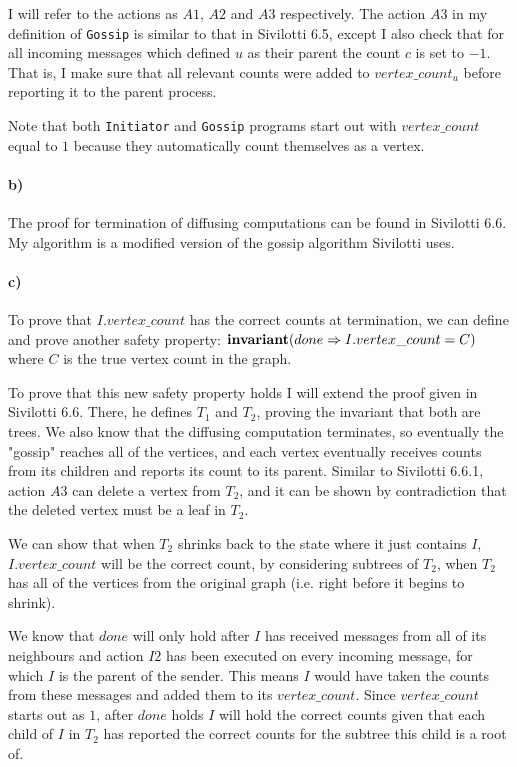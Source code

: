 \documentclass[10pt,letter]{article}
\begin{document}
I will refer to the actions as $A1$, $A2$ and $A3$ respectively. The action $A3$ in my definition of \texttt{Gossip} is similar to that in Sivilotti 6.5, except I also check that for all incoming messages which defined $u$ as their parent the count $c$ is set to $-1$. That is, I make sure that all relevant counts were added to $vertex\_count_u$ before reporting it to the parent process.

Note that both \texttt{Initiator} and \texttt{Gossip} programs start out with $vertex\_count$ equal to $1$ because they automatically count themselves as a vertex.

\paragraph{b)} The proof for termination of diffusing computations can be found in Sivilotti 6.6. My algorithm is a modified version of the gossip algorithm Sivilotti uses.

\paragraph{c)} To prove that $I.vertex\_count$ has the correct counts at termination, we can define and prove another safety property: $\textrm{\textbf{invariant}} (done \Rightarrow I.vertex\_count = C)$ where $C$ is the true vertex count in the graph.

To prove that this new safety property holds I will extend the proof given in Sivilotti 6.6. There, he defines $T_1$ and $T_2$, proving the invariant that both are trees. We also know that the diffusing computation terminates, so eventually the "gossip" reaches all of the vertices, and each vertex eventually receives counts from its children and reports its count to its parent. Similar to Sivilotti 6.6.1, action $A3$ can delete a vertex from $T_2$, and it can be shown by contradiction that the deleted vertex must be a leaf in $T_2$.

We can show that when $T_2$ shrinks back to the state where it just contains $I$, $I.vertex\_count$ will be the correct count, by considering subtrees of $T_2$, when $T_2$ has all of the vertices from the original graph (i.e. right before it begins to shrink).

We know that $done$ will only hold after $I$ has received messages from all of its neighbours and action $I2$ has been executed on every incoming message, for which $I$ is the parent of the sender. This means $I$ would have taken the counts from these messages and added them to its $vertex\_count$. Since $vertex\_count$ starts out as $1$, after $done$ holds $I$ will hold the correct counts given that each child of $I$ in $T_2$ has reported the correct counts for the subtree this child is a root of.
\end{document}
